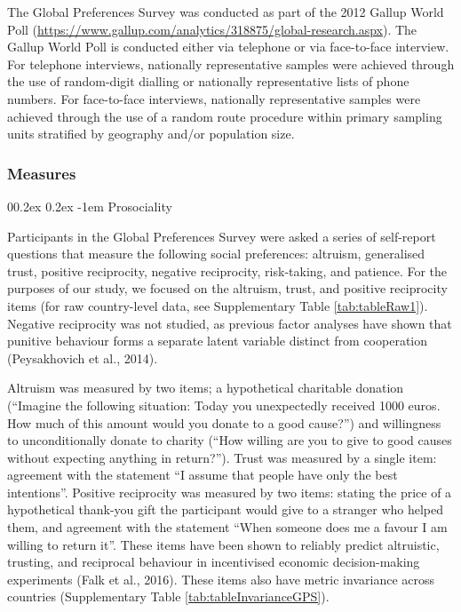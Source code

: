\documentclass[
  man,floatsintext]{apa6}
\makeatletter
\let\oldparagraph\paragraph
\renewcommand{\paragraph}[1]{\oldparagraph{#1}\mbox{}}
\renewcommand{\paragraph}{\@startsection{paragraph}{4}{\parindent}%
  {0\baselineskip \@plus 0.2ex \@minus 0.2ex}%
  {-1em}%
  {\normalfont\normalsize\bfseries\itshape\typesectitle}}
\makeatother
\begin{document}
The Global Preferences Survey was conducted as part of the 2012 Gallup World Poll (\url{https://www.gallup.com/analytics/318875/global-research.aspx}). The Gallup World Poll is conducted either via telephone or via face-to-face interview. For telephone interviews, nationally representative samples were achieved through the use of random-digit dialling or nationally representative lists of phone numbers. For face-to-face interviews, nationally representative samples were achieved through the use of a random route procedure within primary sampling units stratified by geography and/or population size.

\hypertarget{measures}{%
\subsubsection{Measures}\label{measures}}

\hypertarget{prosociality}{%
\paragraph{Prosociality}\label{prosociality}}

Participants in the Global Preferences Survey were asked a series of self-report questions that measure the following social preferences: altruism, generalised trust, positive reciprocity, negative reciprocity, risk-taking, and patience. For the purposes of our study, we focused on the altruism, trust, and positive reciprocity items (for raw country-level data, see Supplementary Table \ref{tab:tableRaw1}). Negative reciprocity was not studied, as previous factor analyses have shown that punitive behaviour forms a separate latent variable distinct from cooperation (Peysakhovich et al., 2014).

Altruism was measured by two items; a hypothetical charitable donation (``Imagine the following situation: Today you unexpectedly received 1000 euros. How much of this amount would you donate to a good cause?'') and willingness to unconditionally donate to charity (``How willing are you to give to good causes without expecting anything in return?''). Trust was measured by a single item: agreement with the statement ``I assume that people have only the best intentions''. Positive reciprocity was measured by two items: stating the price of a hypothetical thank-you gift the participant would give to a stranger who helped them, and agreement with the statement ``When someone does me a favour I am willing to return it''. These items have been shown to reliably predict altruistic, trusting, and reciprocal behaviour in incentivised economic decision-making experiments (Falk et al., 2016). These items also have metric invariance across countries (Supplementary Table \ref{tab:tableInvarianceGPS}).
\end{document}
